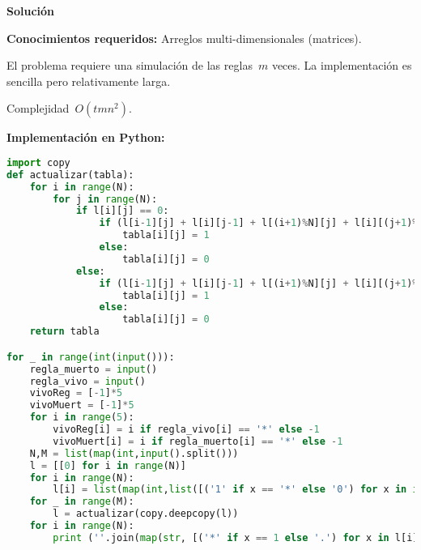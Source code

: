\vspace*{0cm}
{\Large\textbf{Solución}}

\textbf{Conocimientos requeridos:} Arreglos multi-dimensionales (matrices).

El problema requiere una simulación de las reglas~$m$ veces. La implementación es
sencilla pero relativamente larga.

Complejidad~$O(tmn^2)$.

\textbf{Implementación en Python:}

\begin{lstlisting}[language=Python]
import copy
def actualizar(tabla):
    for i in range(N):
        for j in range(N):
            if l[i][j] == 0:
                if (l[i-1][j] + l[i][j-1] + l[(i+1)%N][j] + l[i][(j+1)%N]) in vivoMuert:
                    tabla[i][j] = 1
                else:
                    tabla[i][j] = 0
            else:
                if (l[i-1][j] + l[i][j-1] + l[(i+1)%N][j] + l[i][(j+1)%N]) in vivoReg:
                    tabla[i][j] = 1
                else:
                    tabla[i][j] = 0
    return tabla

for _ in range(int(input())):
    regla_muerto = input()
    regla_vivo = input()
    vivoReg = [-1]*5
    vivoMuert = [-1]*5
    for i in range(5):
        vivoReg[i] = i if regla_vivo[i] == '*' else -1
        vivoMuert[i] = i if regla_muerto[i] == '*' else -1
    N,M = list(map(int,input().split()))
    l = [[0] for i in range(N)]
    for i in range(N):
        l[i] = list(map(int,list([('1' if x == '*' else '0') for x in input()])))
    for _ in range(M):
        l = actualizar(copy.deepcopy(l))
    for i in range(N):
        print (''.join(map(str, [('*' if x == 1 else '.') for x in l[i]])))
\end{lstlisting}

\newpage

